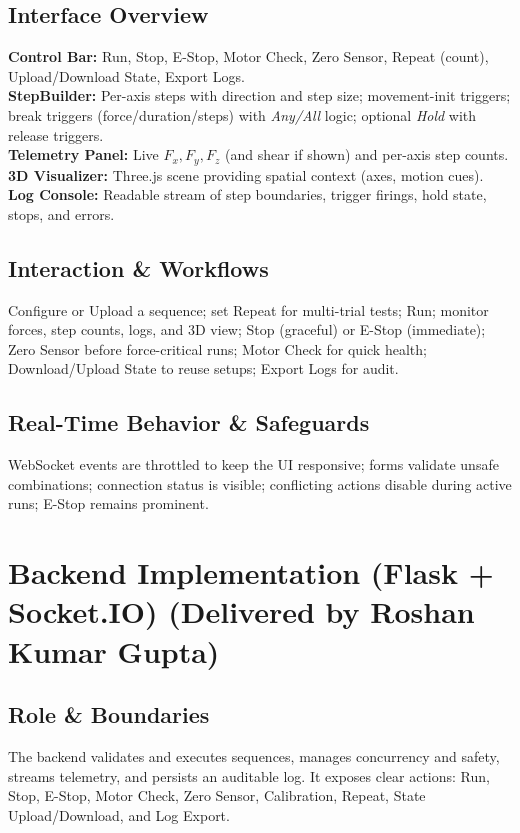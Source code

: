 \documentclass[
    twocolumn,
    fontsize = 10pt,
    parskip = half+,
    headings = small,
    headwidth = text,
    footwidth = text,
]{scrartcl}
\begin{document}
\subsection{Interface Overview}
\textbf{Control Bar:} Run, Stop, E-Stop, Motor Check, Zero Sensor, Repeat (count), Upload/Download State, Export Logs.\\
\textbf{StepBuilder:} Per-axis steps with direction and step size; movement-init triggers; break triggers (force/duration/steps) with \emph{Any/All} logic; optional \emph{Hold} with release triggers.\\
\textbf{Telemetry Panel:} Live $F_x, F_y, F_z$ (and shear if shown) and per-axis step counts.\\
\textbf{3D Visualizer:} Three.js scene providing spatial context (axes, motion cues).\\
\textbf{Log Console:} Readable stream of step boundaries, trigger firings, hold state, stops, and errors.

\subsection{Interaction \& Workflows}
Configure or Upload a sequence; set Repeat for multi-trial tests; Run; monitor forces, step counts, logs, and 3D view; Stop (graceful) or E-Stop (immediate); Zero Sensor before force-critical runs; Motor Check for quick health; Download/Upload State to reuse setups; Export Logs for audit.

\subsection{Real-Time Behavior \& Safeguards}
WebSocket events are throttled to keep the UI responsive; forms validate unsafe combinations; connection status is visible; conflicting actions disable during active runs; E-Stop remains prominent.


\section{Backend Implementation (Flask + Socket.IO) \textnormal{(Delivered by Roshan Kumar Gupta)}}
\label{sec:backend}

\subsection{Role \& Boundaries}
The backend validates and executes sequences, manages concurrency and safety, streams telemetry, and persists an auditable log. It exposes clear actions: Run, Stop, E-Stop, Motor Check, Zero Sensor, Calibration, Repeat, State Upload/Download, and Log Export.
\end{document}
